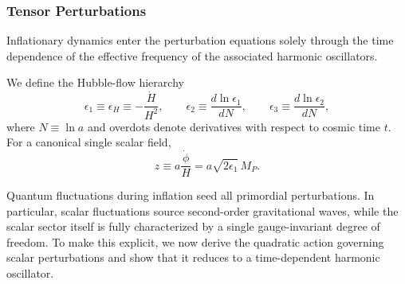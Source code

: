 




\subsubsection{Tensor Perturbations}

Inflationary dynamics enter the perturbation equations solely through the time dependence of the effective frequency of the associated harmonic oscillators.

We define the Hubble-flow hierarchy
\begin{equation}
\epsilon_1 \equiv \epsilon_H \equiv -\frac{\dot H}{H^2}, \qquad
\epsilon_2 \equiv \frac{d\ln\epsilon_1}{dN}, \qquad
\epsilon_3 \equiv \frac{d\ln\epsilon_2}{dN},
\end{equation}
where $N \equiv \ln a$ and overdots denote derivatives with respect to cosmic time $t$. For a canonical single scalar field,
\begin{equation}
z \equiv a\frac{\dot\phi}{H} = a \sqrt{2\epsilon_1}\, M_P .
\end{equation}

Quantum fluctuations during inflation seed all primordial perturbations. In particular, scalar fluctuations source second-order gravitational waves, while the scalar sector itself is fully characterized by a single gauge-invariant degree of freedom. To make this explicit, we now derive the quadratic action governing scalar perturbations and show that it reduces to a time-dependent harmonic oscillator.

